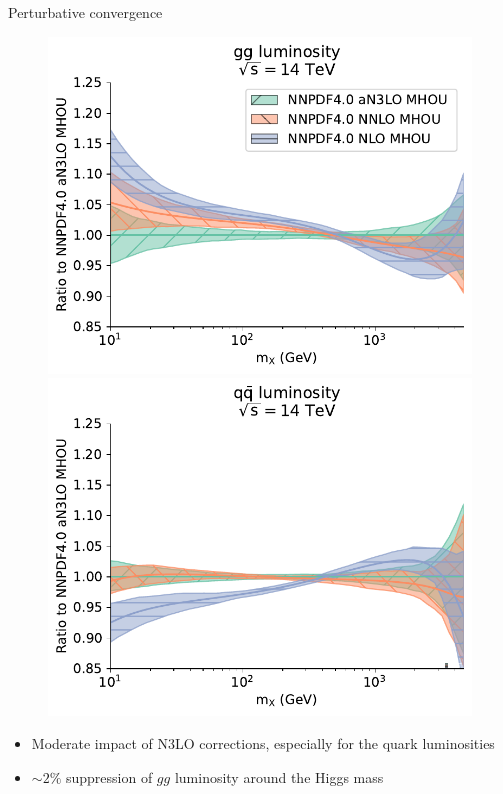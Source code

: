 \begin{frame}{Perturbative convergence}
  \begin{figure}[!t]
    \includegraphics[width=.4\textwidth]{figures/gg_plot_lumi1d_convergence.pdf}
    \includegraphics[width=.4\textwidth]{figures/qqbar_plot_lumi1d_convergence.pdf}
  \end{figure}
  \begin{itemize}
    \item Moderate impact of N3LO corrections, especially for the quark luminosities
    \item $\sim2\%$ suppression of $gg$ luminosity around the Higgs mass
  \end{itemize}
\end{frame}

